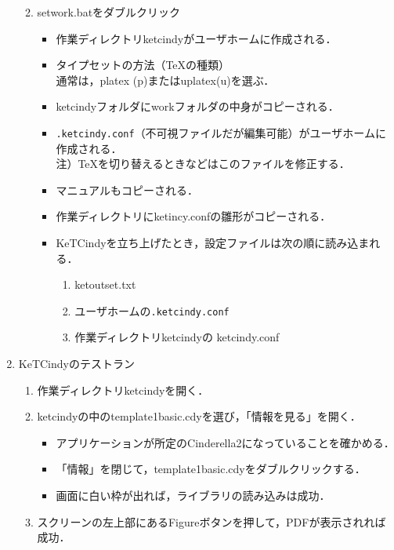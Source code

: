 \documentclass{ujarticle}
\begin{document}
\begin{enumerate}[\bf\large 1.]
\begin{enumerate}[(1)]
\begin{itemize}
    \end{itemize}
  \item setwork.batをダブルクリック
    \begin{itemize}
    \item 作業ディレクトリketcindyがユーザホームに作成される．
    \item タイプセットの方法（TeXの種類）\\
    \hspace*{10mm}通常は，platex (p)またはuplatex(u)を選ぶ．
    \item ketcindyフォルダにworkフォルダの中身がコピーされる．
    \item \verb|.ketcindy.conf|（不可視ファイルだが編集可能）がユーザホームに作成される．\\
    \hspace*{10mm}注）TeXを切り替えるときなどはこのファイルを修正する．
    \item マニュアルもコピーされる．
    \item 作業ディレクトリにketincy.confの雛形がコピーされる．
    \item KeTCindyを立ち上げたとき，設定ファイルは次の順に読み込まれる．
      \begin{enumerate}[1)]
      \item ketoutset.txt
      \item ユーザホームの\verb|.ketcindy.conf|
      \item 作業ディレクトリketcindyの ketcindy.conf
      \end{enumerate}
    \end{itemize}
  \end{enumerate}
  \item KeTCindyのテストラン
    \begin{enumerate}[(1)]
    \item 作業ディレクトリketcindyを開く．
    \item ketcindyの中のtemplate1basic.cdyを選び，「情報を見る」を開く．
      \begin{itemize}
      \item アプリケーションが所定のCinderella2になっていることを確かめる．
      \item「情報」を閉じて，template1basic.cdyをダブルクリックする．
      \item 画面に白い枠が出れば，ライブラリの読み込みは成功．
      \end{itemize}
    \item スクリーンの左上部にあるFigureボタンを押して，PDFが表示されれば成功．
     \begin{itemize}

\end{itemize}
\end{enumerate}
\end{enumerate}
\end{document}
